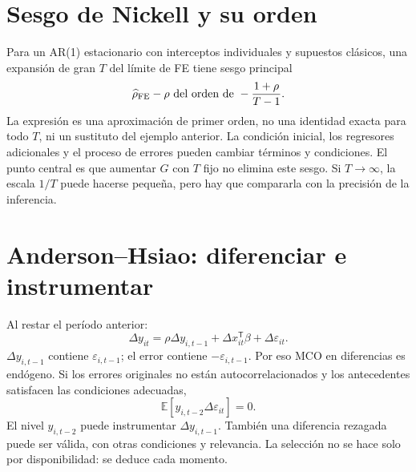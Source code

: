 \documentclass[11pt,a4paper]{article}
\newcommand{\E}{\mathbb E}
\newcommand{\T}{^{\mathsf T}}
\theoremstyle{definition}
\newcommand{\eps}{\varepsilon}
\begin{document}
\section{Sesgo de Nickell y su orden}
Para un AR(1) estacionario con interceptos individuales y supuestos clásicos, una expansión de gran $T$ del límite de FE tiene sesgo principal
\[
\widehat\rho_{\rm FE}-\rho
\ \text{del orden de}\ -\frac{1+\rho}{T-1}.
\]
La expresión es una aproximación de primer orden, no una identidad exacta para todo $T$, ni un sustituto del ejemplo anterior.
La condición inicial, los regresores adicionales y el proceso de errores pueden cambiar términos y condiciones.
El punto central es que aumentar $G$ con $T$ fijo no elimina este sesgo.
Si $T\to\infty$, la escala $1/T$ puede hacerse pequeña, pero hay que compararla con la precisión de la inferencia.

\section{Anderson--Hsiao: diferenciar e instrumentar}
Al restar el período anterior:
\[
\Delta y_{it}=\rho\Delta y_{i,t-1}
+\Delta x_{it}\T\beta+\Delta\eps_{it}.
\]
$\Delta y_{i,t-1}$ contiene $\eps_{i,t-1}$; el error contiene $-\eps_{i,t-1}$.
Por eso MCO en diferencias es endógeno.
Si los errores originales no están autocorrelacionados y los antecedentes satisfacen las condiciones adecuadas,
\[
\E[y_{i,t-2}\Delta\eps_{it}]=0.
\]
El nivel $y_{i,t-2}$ puede instrumentar $\Delta y_{i,t-1}$.
También una diferencia rezagada puede ser válida, con otras condiciones y relevancia. La selección no se hace solo por disponibilidad: se deduce cada momento.
\end{document}
